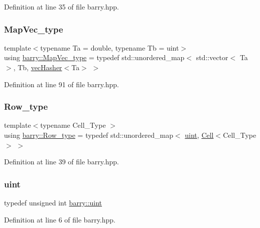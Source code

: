 Definition at line 35 of file barry.\+hpp.

\mbox{\label{namespacebarry_a2f0d3aab1d67e4c8eaeab9022e16139f}} 
\subsubsection{\texorpdfstring{Map\+Vec\+\_\+type}{MapVec\_type}}
{\footnotesize\ttfamily template$<$typename Ta  = double, typename Tb  = uint$>$ \\
using \hyperlink{namespacebarry_a2f0d3aab1d67e4c8eaeab9022e16139f}{barry\+::\+Map\+Vec\+\_\+type} = typedef std\+::unordered\+\_\+map$<$ std\+::vector$<$ Ta $>$, Tb, \hyperlink{structbarry_1_1vec_hasher}{vec\+Hasher}$<$Ta$>$ $>$}



Definition at line 91 of file barry.\+hpp.

\mbox{\label{namespacebarry_a8f67f2e1e26f3cb10d240b7e1a1d917c}} 
\subsubsection{\texorpdfstring{Row\+\_\+type}{Row\_type}}
{\footnotesize\ttfamily template$<$typename Cell\+\_\+\+Type $>$ \\
using \hyperlink{namespacebarry_a8f67f2e1e26f3cb10d240b7e1a1d917c}{barry\+::\+Row\+\_\+type} = typedef std\+::unordered\+\_\+map$<$ \hyperlink{namespacebarry_a11dfc53ddb4672278319aa04f1e09a6c}{uint}, \hyperlink{classbarry_1_1_cell}{Cell}$<$Cell\+\_\+\+Type$>$ $>$}



Definition at line 39 of file barry.\+hpp.

\mbox{\label{namespacebarry_a11dfc53ddb4672278319aa04f1e09a6c}} 
\subsubsection{\texorpdfstring{uint}{uint}}
{\footnotesize\ttfamily typedef unsigned int \hyperlink{namespacebarry_a11dfc53ddb4672278319aa04f1e09a6c}{barry\+::uint}}



Definition at line 6 of file barry.\+hpp.


